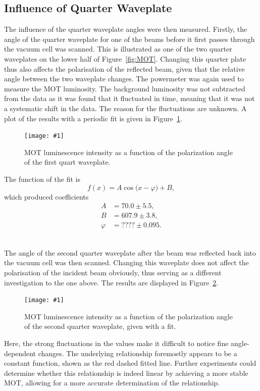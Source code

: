 \documentclass[twocolumn]{article}
\newcommand{\insertFigure}[1]{%
   \texttt{[image: \#1]}%
}
\begin{document}
\subsection{Influence of Quarter Waveplate}
The influence of the quarter waveplate angles were then measured. Firstly, the angle of the quarter waveplate for one of the beams before it first passes through the vacuum cell was scanned. This is illustrated as one of the two quarter waveplates on the lower half of Figure~\ref{fig:MOT}. Changing this quarter plate thus also affects the polarisation of the reflected beam, given that the relative angle between the two waveplate changes. The powermeter was again used to measure the MOT luminosity. The background luminosity was not subtracted from the data as it was found that it fluctuated in time, meaning that it was not a systematic shift in the data. The reason for the fluctuations are unknown. A plot of the results with a periodic fit is given in Figure~\ref{fig:Waveplate}. 
\begin{figure} [!h]
	\centering
	\insertFigure{Images/Waveplate1_w_fit.png}
	\caption{MOT luminescence intensity as a function of the polarization angle of the first quart waveplate.}
	\label{fig:Waveplate}
\end{figure}
The function of the fit is
\begin{equation}
f(x) = A \cos\big(x - \varphi \big) + B, \nonumber
\end{equation}
which produced coefficients
\begin{align*}
A &=  70.0 \pm 5.5,\\
B &=  607.9\pm 3.8,\\
\varphi &=  ???? \pm 0.095.
\end{align*} \\

\par The angle of the second quarter waveplate after the beam was reflected back into the vacuum cell was then scanned. Changing this waveplate does not affect the polarisation of the incident beam obviously, thus serving as a different investigation to the one above. The results are displayed in Figure~\ref{fig:Waveplate2}.
\begin{figure} [!h]
	\centering
	\insertFigure{Images/Waveplate2.png}
	\caption{MOT luminescence intensity as a function of the polarization angle of the second quarter waveplate, given with a fit.}
	\label{fig:Waveplate2}
\end{figure}
Here, the strong fluctuations in the values make it difficult to notice fine angle-dependent changes. The underlying relationship foremostly appears to be a constant function, shown as the red dashed fitted line. Further experiments could determine whether this relationship is indeed linear by achieving a more stable MOT, allowing for a more accurate determination of the relationship.
\end{document}
